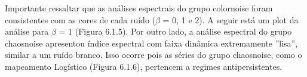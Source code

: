 \begin{figure}[ht!]
	\vspace{-3mm}	%
	\begin{center}
	\end{center}
	\vspace{-3mm}	%
	\label{ex6_fig3}
\end{figure}


\clearpage
Importante ressaltar que as análises espectrais do grupo colornoise foram consistentes com as cores de cada ruído ($\beta$ = 0, 1 e 2). A seguir está um plot da análise para $\beta$ = 1 (Figura 6.1.5). Por outro lado, a análise espectral do grupo chaosnoise apresentou índice espectral com faixa dinâmica extremamente ''lisa'', similar a um ruído branco. Isso ocorre pois as séries do grupo chaosnoise, como o mapeamento Logístico (Figura 6.1.6), pertencem a regimes antipersistentes. 

